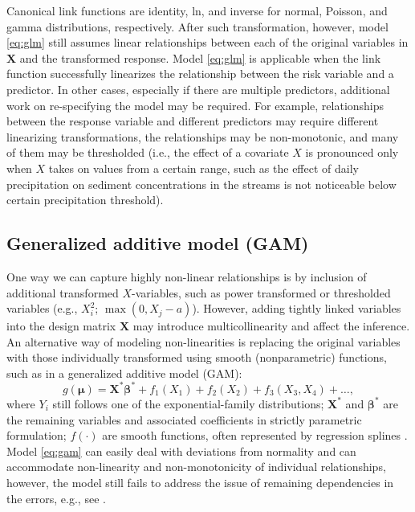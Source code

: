 \documentclass[
]{book}
\begin{document}
Canonical link functions are identity, ln, and inverse for normal, Poisson, and gamma distributions, respectively. After such transformation, however, model \eqref{eq:glm} still assumes linear relationships between each of the original variables in \(\mathbf{X}\) and the transformed response. Model \eqref{eq:glm} is applicable when the link function successfully linearizes the relationship between the risk variable and a predictor. In other cases, especially if there are multiple predictors, additional work on re-specifying the model may be required. For example, relationships between the response variable and different predictors may require different linearizing transformations, the relationships may be non-monotonic, and many of them may be thresholded (i.e., the effect of a covariate \(X\) is pronounced only when \(X\) takes on values from a certain range, such as the effect of daily precipitation on sediment concentrations in the streams is not noticeable below certain precipitation threshold).

\hypertarget{generalized-additive-model-gam}{%
\subsection{Generalized additive model (GAM)}\label{generalized-additive-model-gam}}

One way we can capture highly non-linear relationships is by inclusion of additional transformed \(X\)-variables, such as power transformed or thresholded variables (e.g., \(X_i^2\); \(\max(0, X_j - a)\)). However, adding tightly linked variables into the design matrix \(\mathbf{X}\) may introduce multicollinearity and affect the inference. An alternative way of modeling non-linearities is replacing the original variables with those individually transformed using smooth (nonparametric) functions, such as in a generalized additive model (GAM):
\begin{equation}
    \label{eq:gam}
    g(\boldsymbol{\mu}) = \mathbf{X}^*\boldsymbol{\beta}^* + f_1(X_1) + f_2(X_2) + f_3(X_3,X_4) + \ldots,
\end{equation}
where \(Y_i\) still follows one of the exponential-family distributions; \(\mathbf{X}^*\) and \(\boldsymbol{\beta}^*\) are the remaining variables and associated coefficients in strictly parametric formulation; \(f(\cdot)\) are smooth functions, often represented by regression splines \citep{Wood:2006book}. Model \eqref{eq:gam} can easily deal with deviations from normality and can accommodate non-linearity and non-monotonicity of individual relationships, however, the model still fails to address the issue of remaining dependencies in the errors, e.g., see \citet{Kohn:etal:2000}.
\end{document}
